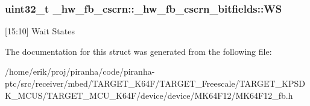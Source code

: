 \subsubsection[{\texorpdfstring{WS}{WS}}]{\setlength{\rightskip}{0pt plus 5cm}uint32\+\_\+t \+\_\+hw\+\_\+fb\+\_\+cscrn\+::\+\_\+hw\+\_\+fb\+\_\+cscrn\+\_\+bitfields\+::\+WS}\hypertarget{struct__hw__fb__cscrn_1_1__hw__fb__cscrn__bitfields_aab78719a778d5b98bf3d072afd04ab7a}{}\label{struct__hw__fb__cscrn_1_1__hw__fb__cscrn__bitfields_aab78719a778d5b98bf3d072afd04ab7a}
\mbox{[}15\+:10\mbox{]} Wait States 

The documentation for this struct was generated from the following file\+:\begin{DoxyCompactItemize}
\item 
/home/erik/proj/piranha/code/piranha-\/ptc/src/receiver/mbed/\+T\+A\+R\+G\+E\+T\+\_\+\+K64\+F/\+T\+A\+R\+G\+E\+T\+\_\+\+Freescale/\+T\+A\+R\+G\+E\+T\+\_\+\+K\+P\+S\+D\+K\+\_\+\+M\+C\+U\+S/\+T\+A\+R\+G\+E\+T\+\_\+\+M\+C\+U\+\_\+\+K64\+F/device/device/\+M\+K64\+F12/M\+K64\+F12\+\_\+fb.\+h\end{DoxyCompactItemize}
